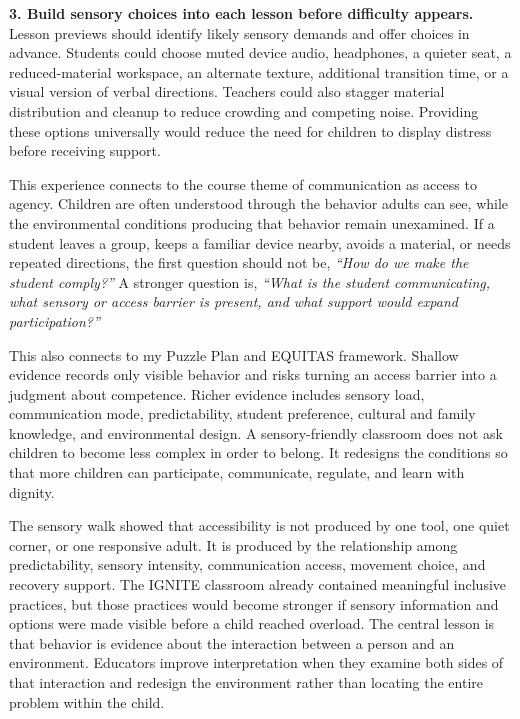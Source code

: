 \documentclass[11pt]{article}
\newcommand{\reviewsection}[1]{\vspace{0.07in}\noindent{\normalsize\bfseries\color{PrimaryRed}#1}\par\vspace{0.02in}}
\begin{document}
\textbf{3. Build sensory choices into each lesson before difficulty appears.} Lesson previews should identify likely sensory demands and offer choices in advance. Students could choose muted device audio, headphones, a quieter seat, a reduced-material workspace, an alternate texture, additional transition time, or a visual version of verbal directions. Teachers could also stagger material distribution and cleanup to reduce crowding and competing noise. Providing these options universally would reduce the need for children to display distress before receiving support.

\reviewsection{Connection to the Course Theme}

This experience connects to the course theme of communication as access to agency. Children are often understood through the behavior adults can see, while the environmental conditions producing that behavior remain unexamined. If a student leaves a group, keeps a familiar device nearby, avoids a material, or needs repeated directions, the first question should not be, \textit{``How do we make the student comply?''} A stronger question is, \textit{``What is the student communicating, what sensory or access barrier is present, and what support would expand participation?''}

This also connects to my Puzzle Plan and EQUITAS framework. Shallow evidence records only visible behavior and risks turning an access barrier into a judgment about competence. Richer evidence includes sensory load, communication mode, predictability, student preference, cultural and family knowledge, and environmental design. A sensory-friendly classroom does not ask children to become less complex in order to belong. It redesigns the conditions so that more children can participate, communicate, regulate, and learn with dignity.

\reviewsection{Conclusion}

The sensory walk showed that accessibility is not produced by one tool, one quiet corner, or one responsive adult. It is produced by the relationship among predictability, sensory intensity, communication access, movement choice, and recovery support. The IGNITE classroom already contained meaningful inclusive practices, but those practices would become stronger if sensory information and options were made visible before a child reached overload. The central lesson is that behavior is evidence about the interaction between a person and an environment. Educators improve interpretation when they examine both sides of that interaction and redesign the environment rather than locating the entire problem within the child.
\end{document}
